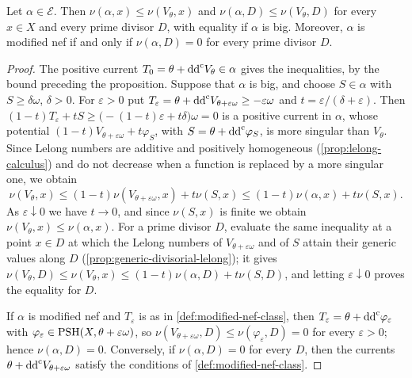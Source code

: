 \begin{proposition}\label{prop:big-class-minimal-multiplicity}
Let $\alpha\in\mathcal E$. Then $\nu(\alpha,x)\leq\nu(V_\theta,x)$ and $\nu(\alpha,D)\leq\nu(V_\theta,D)$ for every $x\in X$ and every prime divisor $D$, with equality if $\alpha$ is big. Moreover, $\alpha$ is modified nef if and only if $\nu(\alpha,D)=0$ for every prime divisor $D$.
\end{proposition}
\begin{proof}
The positive current $T_0=\theta+\mathrm{dd}^{\mathrm{c}} V_\theta\in\alpha$ gives the inequalities, by the bound preceding the proposition. Suppose that $\alpha$ is big, and choose $S\in\alpha$ with $S\geq\delta\omega$, $\delta>0$. For $\varepsilon>0$ put $T_\varepsilon=\theta+\mathrm{dd}^{\mathrm{c}} V_{\theta+\varepsilon\omega}\geq-\varepsilon\omega$ and $t=\varepsilon/(\delta+\varepsilon)$. Then $(1-t)T_\varepsilon+tS\geq\bigl(-(1-t)\varepsilon+t\delta\bigr)\omega=0$ is a positive current in $\alpha$, whose potential $(1-t)V_{\theta+\varepsilon\omega}+t\varphi_S$, with $S=\theta+\mathrm{dd}^{\mathrm{c}}\varphi_S$, is more singular than $V_\theta$. Since Lelong numbers are additive and positively homogeneous (\cref{prop:lelong-calculus}) and do not decrease when a function is replaced by a more singular one, we obtain
\[
 \nu(V_\theta,x)\leq(1-t)\nu(V_{\theta+\varepsilon\omega},x)+t\nu(S,x)\leq(1-t)\nu(\alpha,x)+t\nu(S,x).
\]
As $\varepsilon\downarrow0$ we have $t\to0$, and since $\nu(S,x)$ is finite we obtain $\nu(V_\theta,x)\leq\nu(\alpha,x)$. For a prime divisor $D$, evaluate the same inequality at a point $x\in D$ at which the Lelong numbers of $V_{\theta+\varepsilon\omega}$ and of $S$ attain their generic values along $D$ (\cref{prop:generic-divisorial-lelong}); it gives $\nu(V_\theta,D)\leq\nu(V_\theta,x)\leq(1-t)\nu(\alpha,D)+t\nu(S,D)$, and letting $\varepsilon\downarrow0$ proves the equality for $D$.

If $\alpha$ is modified nef and $T_\varepsilon$ is as in \cref{def:modified-nef-class}, then $T_\varepsilon=\theta+\mathrm{dd}^{\mathrm{c}}\varphi_\varepsilon$ with $\varphi_\varepsilon\in\mathrm{PSH}(X,\theta+\varepsilon\omega)$, so $\nu(V_{\theta+\varepsilon\omega},D)\leq\nu(\varphi_\varepsilon,D)=0$ for every $\varepsilon>0$; hence $\nu(\alpha,D)=0$. Conversely, if $\nu(\alpha,D)=0$ for every $D$, then the currents $\theta+\mathrm{dd}^{\mathrm{c}} V_{\theta+\varepsilon\omega}$ satisfy the conditions of \cref{def:modified-nef-class}.
\end{proof}

